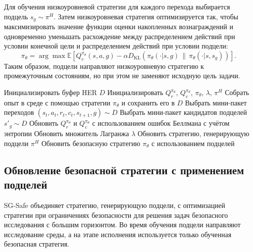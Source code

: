Для обучения низкоуровневой стратегии для каждого перехода выбирается подцель $s_g \sim \pi^H$. Затем низкоуровневая стратегия оптимизируется так, чтобы максимизировать значение функции оценки накопленных вознаграждений и одновременно уменьшать расхождение между распределением действий при условии конечной цели и распределением действий при условии подцели:
\begin{equation}
\pi_\theta
=
\arg\max
\mathbb{E}
\left[
Q_r^{\pi_\theta}(s,a,g)
-
\alpha
D_{\mathrm{KL}}
\left(
\pi_\theta(\cdot|s,g)\,\|\,\pi_\theta(\cdot|s,s_g)
\right)
\right].
\end{equation}
Таким образом, подцели направляют низкоуровневую стратегию к промежуточным состояниям, но при этом не заменяют исходную цель задачи.

\begin{algorithm}[t]
\caption{SG-Safe}
\label{alg:sgsafe}
\begin{algorithmic}[1]
    \State Инициализировать буфер HER $D$
    \State Инициализировать $Q^{\pi_\theta}_r$, $Q^{\pi_\theta}_c$, $\pi_{\theta}$, $\lambda$, $\pi^H$
        \State Собрать опыт в среде с помощью стратегии $\pi_\theta$ и сохранить его в $D$
        \State Выбрать мини-пакет переходов $(s_t, a_t, r_t, c_t, s_{t+1}, g) \sim D$
        \State Выбрать мини-пакет кандидатов подцелей $s'_g \sim D$
        \State Обновить $Q^{\pi_\theta}_r$ и $Q^{\pi_\theta}_c$ с использованием ошибок Беллмана с учётом энтропии
        \State Обновить множитель Лагранжа $\lambda$
        \State Обновить стратегию, генерирующую подцели $\pi^H$
        \State Обновить безопасную стратегию $\pi_{\theta}$ с использованием подцелей
    \EndFor
\end{algorithmic}
\end{algorithm}

\subsection{Обновление безопасной стратегии с применением подцелей}
\label{subsec:sgsafe_policy_update}

SG-Safe объединяет стратегию, генерирующую подцели, с оптимизацией стратегии при ограничениях безопасности для решения задач безопасного исследования с большим горизонтом. Во время обучения подцели направляют исследование среды, а на этапе исполнения используется только обученная безопасная стратегия.

